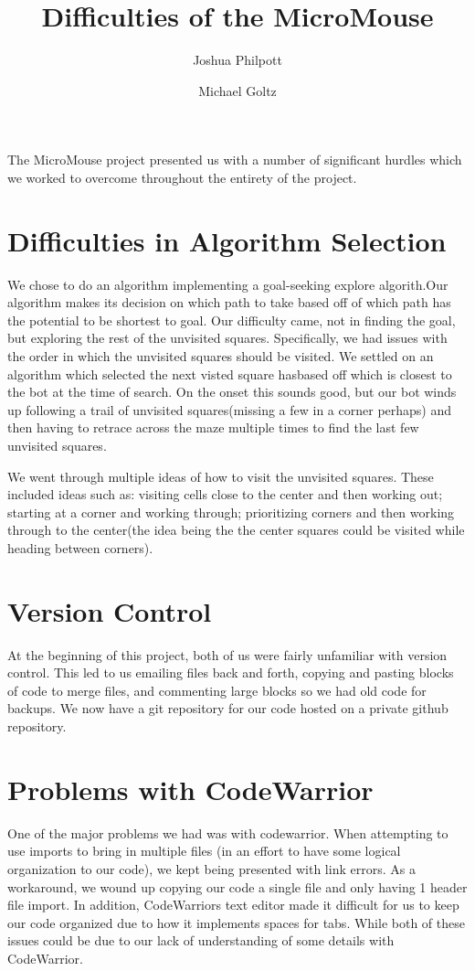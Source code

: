 \documentclass{report}
\begin{document}
\title{Difficulties of the MicroMouse}
\author{Joshua Philpott\\
		\and
		Michael Goltz}

\maketitle


The MicroMouse project presented us with a number of significant hurdles which we worked to overcome throughout the entirety of the project. 

\section{Difficulties in Algorithm Selection}
We chose to do an algorithm implementing a goal-seeking explore algorith.Our algorithm makes its decision on which path to take based off of which path has the potential to be shortest to goal. Our difficulty came, not in finding the goal, but exploring the rest of the unvisited squares. Specifically, we had issues with the order in which the unvisited squares should be visited. We settled on an algorithm which selected the next visted square hasbased off which is closest to the bot at the time of search. On the onset this sounds good, but our bot winds up following a trail of unvisited squares(missing a few in a corner perhaps) and then having to retrace across the maze multiple times to find the last few unvisited squares.

We went through multiple ideas of how to visit the unvisited squares. These included ideas such as: visiting cells close to the center and then working out; starting at a corner and working through; prioritizing corners and then working through to the center(the idea being the the center squares could be visited while heading between corners).

\section{Version Control}
At the beginning of this project, both of us were fairly unfamiliar with version control. This led to us emailing files back and forth, copying and pasting blocks of code to merge files, and commenting large blocks so we had old code for backups. We now have a git repository for our code hosted on a private github repository.

\section{Problems with CodeWarrior}
One of the major problems we had was with codewarrior. When attempting to use imports to bring in multiple files (in an effort to have some logical organization to our code), we kept being presented with link errors. As a workaround, we wound up copying our code a single file and only having 1 header file import. In addition, CodeWarriors text editor made it difficult for us to keep our code organized due to how it implements spaces for tabs. While both of these issues could be due to our lack of understanding of some details with CodeWarrior.
\end{document}
